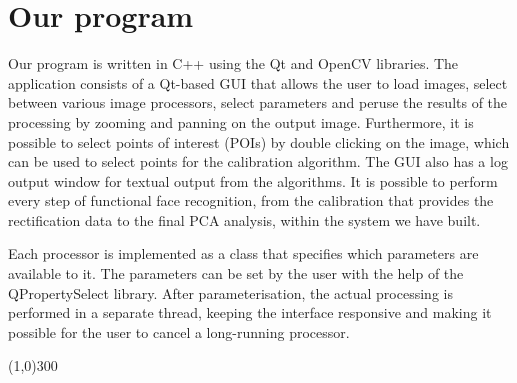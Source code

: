 \section{Our program}
\label{sec:prog}
Our program is written in C++ using the Qt and OpenCV libraries.
The application consists of a Qt-based GUI that allows the user to load
images, select between various image processors, select parameters and
peruse the results of the processing by zooming and panning on the
output image. Furthermore, it is possible to select points of interest
(POIs) by double clicking on the image, which can be used to select
points for the calibration algorithm. The GUI also has a log output
window for textual output from the algorithms. It is possible to perform
every step of functional face recognition, from the calibration that provides
the rectification data to the final PCA analysis,
within the system we have built.

Each processor is implemented as a class that specifies which
parameters are available to it. The parameters can be set
by the user with the help of the QPropertySelect library. After parameterisation, the 
actual processing is performed in a separate thread,
keeping the interface responsive and making it possible for the user to
cancel a long-running processor.





\begin{center}
\line(1,0){300}
\end{center}